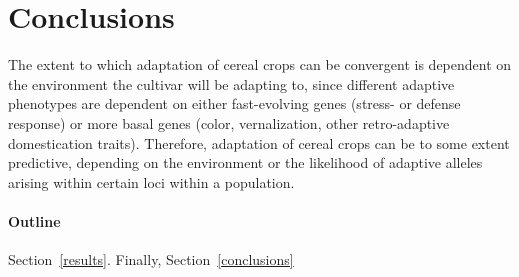 \documentclass[12pt]{article}
\begin{document}
\section{Conclusions}
The extent to which adaptation of cereal crops can be convergent is dependent on the environment the cultivar will be adapting to, since different adaptive phenotypes are dependent on either fast-evolving genes (stress- or defense response) or more basal genes (color, vernalization, other retro-adaptive domestication traits). Therefore, adaptation of cereal crops can be to some extent predictive, depending on the environment or the likelihood of adaptive alleles arising within certain loci within a population. 

\paragraph{Outline}
 Section~\ref{results}.
Finally, Section~\ref{conclusions} 





\end{document}
